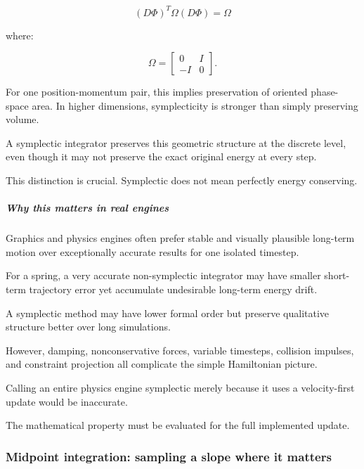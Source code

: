 \[
\boxed{ (D\Phi)^T\Omega(D\Phi)=\Omega }
\]

where:

\[
\Omega= \begin{bmatrix} 0&I\\ -I&0 \end{bmatrix}.
\]

For one position-momentum pair, this implies preservation of oriented phase-space area. In higher dimensions, symplecticity is stronger than simply preserving volume.

A symplectic integrator preserves this geometric structure at the discrete level, even though it may not preserve the exact original energy at every step.

This distinction is crucial. Symplectic does not mean perfectly energy conserving.

\subparagraph{Why this matters in real engines}\label{02-foundations-ii-ch025-why-this-matters-in-real-engines}

\hypertarget{02-foundations-ii-ch025-why-this-matters-in-real-engines}{}

Graphics and physics engines often prefer stable and visually plausible long-term motion over exceptionally accurate results for one isolated timestep.

For a spring, a very accurate non-symplectic integrator may have smaller short-term trajectory error yet accumulate undesirable long-term energy drift.

A symplectic method may have lower formal order but preserve qualitative structure better over long simulations.

However, damping, nonconservative forces, variable timesteps, collision impulses, and constraint projection all complicate the simple Hamiltonian picture.

Calling an entire physics engine symplectic merely because it uses a velocity-first update would be inaccurate.

The mathematical property must be evaluated for the full implemented update.

\subsubsection{Midpoint integration: sampling a slope where it matters}\label{02-foundations-ii-ch025-midpoint-integration-sampling-a-slope-where-it-matters}

\hypertarget{02-foundations-ii-ch025-midpoint-integration-sampling-a-slope-where-it-matters}{}

